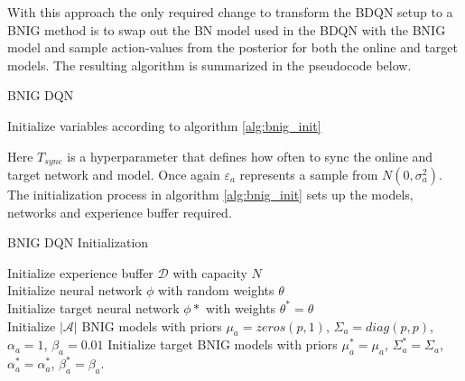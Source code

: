 With this approach the only required change to transform the BDQN setup to a BNIG method is to swap out the BN model used in the BDQN with the BNIG model and sample action-values from the posterior for both the online and target models. The resulting algorithm is summarized in the pseudocode below.

\begin{algorithm}[H]
    \caption{BNIG DQN}
    Initialize variables according to algorithm \ref{alg:bnig_init}\\
\end{algorithm}

Here $T_{sync}$ is a hyperparameter that defines how often to sync the online and target network and model. Once again $\varepsilon_a$ represents a sample from $N(0,\sigma^2_a)$. The initialization process in algorithm \ref{alg:bnig_init} sets up the models, networks and experience buffer required.

\begin{algorithm}[H]
    \caption{BNIG DQN Initialization}
    \label{alg:bnig_init}
    Initialize experience buffer $\mathcal{D}$ with capacity $N$\\
    Initialize neural network $\phi$ with random weights $\theta$\\
    Initialize target neural network $\phi*$ with weights $\theta^*=\theta$\\
    Initialize $|\mathcal{A}|$ BNIG models with priors $\mu_a = zeros(p,1)$, $\Sigma_a = diag(p,p)$, $\alpha_a = 1$, $\beta_a = 0.01$
    Initialize target BNIG models with priors $\mu^*_a = \mu_a$, $\Sigma^*_a = \Sigma_a$, $\alpha^*_a = \alpha^*_a$, $\beta^*_a = \beta_a$.
\end{algorithm}

